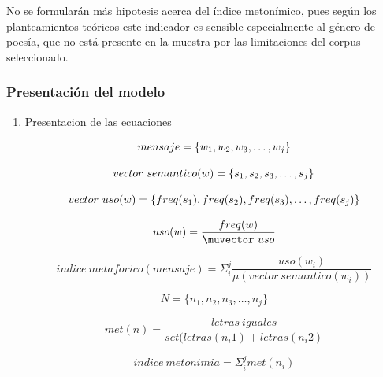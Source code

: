 \documentclass[twoside]{article}
\begin{document}
No se formularán más hipotesis acerca del índice metonímico, pues según los planteamientos teóricos este indicador
es sensible especialmente al género de poesía, que no está presente en la muestra por las limitaciones del corpus
seleccionado.



\subsubsection{Presentación del modelo}
\label{sec:org68e7b91}
\begin{enumerate}
\item Presentacion de las ecuaciones
\label{sec:org331824c}

      \begin{equation}
mensaje = \{ w_1, w_2, w_3, \dots , w_j \} \\
\end{equation}

\begin{equation}
vector\ semantico(w) = \{s_1, s_2, s_3, \dots, s_j \} \\
\end{equation}

\begin{equation}
vector\ uso(w) = \{freq(s_1),freq(s_2),freq(s_3), \dots, freq(s_j) \} \\
\end{equation}

\begin{equation}
uso(w) = \frac{freq(w)}{\muvector\ uso}
\end{equation}


\begin{equation}
indice\ metaforico(mensaje) =  \Sigma_i^j \frac{uso(w_i)}{\mu( vector\ semantico(w_i))}
\end{equation}


\begin{equation}
N = \{n_1, n_2, n_3, \dots , n_j\}
\end{equation}

\begin{equation}
met(n) = \frac{letras\ iguales}{ set(letras(n_i1) + letras(n_i2)}
\end{equation}

\begin{equation}
indice\ metonimia = \Sigma_i^j met(n_i)
\end{equation}


\end{enumerate}
\end{document}
